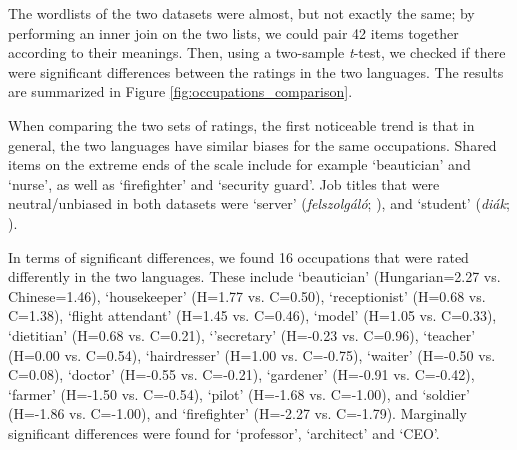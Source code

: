 \documentclass[11pt]{article}
\newcommand{\zh}[1]{\simplifiedchinesefont{#1}\rmfamily}
\begin{document}
The wordlists of the two datasets were almost, but not exactly the same; by performing an inner join on the two lists, we could pair 42 items together according to their meanings. Then, using a two-sample \textit{t}-test, we checked if there were significant differences between the ratings in the two languages. The results are summarized in Figure \ref{fig:occupations_comparison}.

When comparing the two sets of ratings, the first noticeable trend is that in general, the two languages have similar biases for the same occupations. Shared items on the extreme ends of the scale include for example `beautician' and `nurse', as well as `firefighter' and `security guard'. Job titles that were neutral/unbiased in both datasets were `server' (\textit{felszolgáló}; \zh{服务员}), and `student' (\textit{diák}; \zh{学生}).


In terms of significant differences, we found 16 occupations that were rated differently in the two languages. These include `beautician' (Hungarian=2.27 vs. Chinese=1.46), `housekeeper' (H=1.77 vs. C=0.50), `receptionist' (H=0.68 vs. C=1.38), `flight attendant' (H=1.45 vs. C=0.46), `model' (H=1.05 vs. C=0.33), `dietitian' (H=0.68 vs. C=0.21), `'secretary' (H=-0.23 vs. C=0.96), `teacher' (H=0.00 vs. C=0.54), `hairdresser' (H=1.00 vs. C=-0.75), `waiter' (H=-0.50 vs. C=0.08), `doctor' (H=-0.55 vs. C=-0.21), `gardener' (H=-0.91 vs. C=-0.42), `farmer' (H=-1.50 vs. C=-0.54),  `pilot' (H=-1.68 vs. C=-1.00), and `soldier' (H=-1.86 vs. C=-1.00), and `firefighter' (H=-2.27 vs. C=-1.79). Marginally significant differences were found for `professor', `architect' and `CEO'. 
\end{document}
